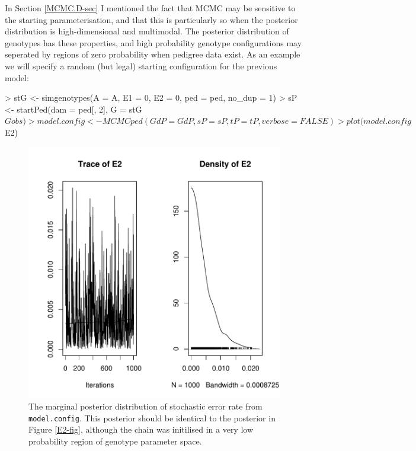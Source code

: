 \documentclass{article}
\begin{document}
In Section \ref{MCMC.D-sec} I mentioned the fact that MCMC may be sensitive to the starting parameterisation, and that this is particularly so when the posterior distribution is high-dimensional and multimodal.  The posterior distribution of genotypes has these properties, and high probability genotype configurations may seperated by regions of zero probability when pedigree data exist.  As an example we will specify a random (but legal) starting configuration for the previous model:

\begin{Schunk}
\begin{Sinput}
> stG <- simgenotypes(A = A, E1 = 0, E2 = 0, ped = ped, no_dup = 1)
> sP <- startPed(dam = ped[, 2], G = stG$Gobs)
> model.config <- MCMCped(GdP = GdP, sP = sP, tP = tP, verbose = FALSE)
> plot(model.config$E2)
\end{Sinput}
\end{Schunk}



\begin{figure}[!h]
\begin{center}
\includegraphics{Tutorial-047}
\end{center}
\caption{The marginal posterior distribution of stochastic error rate from \texttt{model.config}. This posterior should be identical to the posterior in Figure \ref{E2-fig}, although the chain was initilised in a very low probability region of genotype parameter space.}
\label{E2con-fig}
\end{figure}
\end{document}
